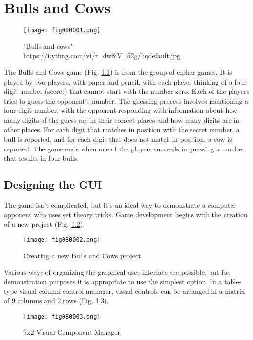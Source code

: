 ﻿\chapter{Bulls and Cows}

\begin{figure}[H]
   \centering
   \texttt{[image: fig080001.png]}
   \caption{"Bulls and cows" \\ https://i.ytimg.com/vi/r\_dw8iV\_52g/hqdefault.jpg}
\label{fig080001}
\end{figure}

The Bulls and Cows game (Fig. \ref{fig080001}) is from the group of cipher games. It is played by two players, with paper and pencil, with each player thinking of a four-digit number (secret) that cannot start with the number zero. Each of the players tries to guess the opponent's number. The guessing process involves mentioning a four-digit number, with the opponent responding with information about how many digits of the guess are in their correct places and how many digits are in other places. For each digit that matches in position with the secret number, a bull is reported, and for each digit that does not match in position, a cow is reported. The game ends when one of the players succeeds in guessing a number that results in four bulls.

\section{Designing the GUI}

The game isn't complicated, but it's an ideal way to demonstrate a computer opponent who uses set theory tricks. Game development begins with the creation of a new project (Fig. \ref{fig080002}).

\begin{figure}[H]
   \centering
   \texttt{[image: fig080002.png]}
   \caption{Creating a new Bulls and Cows project}
\label{fig080002}
\end{figure}

Various ways of organizing the graphical user interface are possible, but for demonstration purposes it is appropriate to use the simplest option. In a table-type visual column control manager, visual controls can be arranged in a matrix of 9 columns and 2 rows (Fig. \ref{fig080003}).

\begin{figure}[H]
   \centering
   \texttt{[image: fig080003.png]}
   \caption{9x2 Visual Component Manager}
\label{fig080003}
\end{figure}

